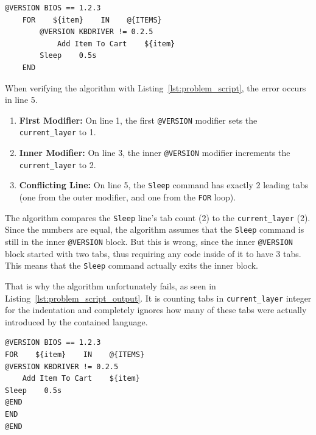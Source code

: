 \begin{lstlisting}[caption={Problematic edge case}, label={lst:problem_script}, float=htbp]
@VERSION BIOS == 1.2.3
    FOR    ${item}    IN    @{ITEMS}
        @VERSION KBDRIVER != 0.2.5
            Add Item To Cart    ${item}
        Sleep    0.5s
    END
\end{lstlisting}


When verifying the algorithm with Listing~\ref{lst:problem_script}, the error occurs in line 5.

\begin{enumerate}

    \item \textbf{First Modifier:} On line 1, the first \texttt{@VERSION} modifier sets the \texttt{current\_layer} to 1.

    \item \textbf{Inner Modifier:} On line 3, the inner \texttt{@VERSION} modifier increments the \texttt{current\_layer} to 2.

    \item \textbf{Conflicting Line:} On line 5, the \texttt{Sleep} command has exactly 2 leading tabs (one from the outer modifier, and one from the \texttt{FOR} loop).

\end{enumerate}

The algorithm compares the \texttt{Sleep} line's tab count (2) to the \texttt{current\_layer} (2). Since the numbers are equal, the algorithm assumes that the \texttt{Sleep} command is still in the inner \texttt{@VERSION} block. But this is wrong, since the inner \texttt{@VERSION} block started with two tabs, thus requiring any code inside of it to have 3 tabs. This means that the \texttt{Sleep} command actually exits the inner block.

That is why the algorithm unfortunately fails, as seen in Listing~\ref{lst:problem_script_output}. It is counting tabs in \texttt{current\_layer} integer for the indentation and completely ignores how many of these tabs were actually introduced by the contained language.

\begin{lstlisting}[caption={Wrong output of the problematic script with the first approach}, label={lst:problem_script_output}, float=htbp]
@VERSION BIOS == 1.2.3
FOR    ${item}    IN    @{ITEMS}
@VERSION KBDRIVER != 0.2.5
    Add Item To Cart    ${item}
Sleep    0.5s
@END
END
@END
\end{lstlisting}

